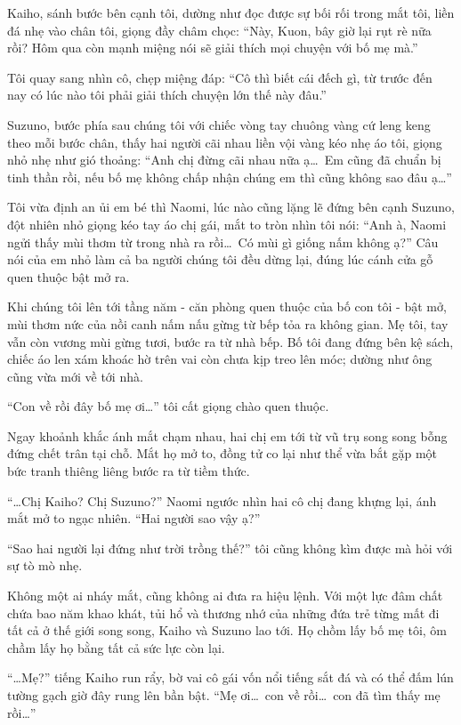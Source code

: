 ﻿\documentclass[../main.tex]{subfiles}
\begin{document}
Kaiho, sánh bước bên cạnh tôi, dường như đọc được sự bối rối trong mắt tôi, liền đá nhẹ vào chân tôi, giọng đầy châm chọc: ``Này, Kuon, bây giờ lại rụt rè nữa rồi? Hôm qua còn mạnh miệng nói sẽ giải thích mọi chuyện với bố mẹ mà.''

Tôi quay sang nhìn cô, chẹp miệng đáp: ``Cô thì biết cái đếch gì, từ trước đến nay có lúc nào tôi phải giải thích chuyện lớn thế này đâu.''

Suzuno, bước phía sau chúng tôi với chiếc vòng tay chuông vàng cứ leng keng theo mỗi bước chân, thấy hai người cãi nhau liền vội vàng kéo nhẹ áo tôi, giọng nhỏ nhẹ như gió thoảng: ``Anh chị đừng cãi nhau nữa ạ\dots\ Em cũng đã chuẩn bị tinh thần rồi, nếu bố mẹ không chấp nhận chúng em thì cũng không sao đâu ạ\dots''

Tôi vừa định an ủi em bé thì Naomi, lúc nào cũng lặng lẽ đứng bên cạnh Suzuno, đột nhiên nhỏ giọng kéo tay áo chị gái, mắt to tròn nhìn tôi nói: ``Anh à, Naomi ngửi thấy mùi thơm từ trong nhà ra rồi\dots\ Có mùi gì giống nấm không ạ?'' Câu nói của em nhỏ làm cả ba người chúng tôi đều dừng lại, đúng lúc cánh cửa gỗ quen thuộc bật mở ra.

Khi chúng tôi lên tới tầng năm - căn phòng quen thuộc của bố con tôi - bật mở, mùi thơm nức của nồi canh nấm nấu gừng từ bếp tỏa ra không gian. Mẹ tôi, tay vẫn còn vương mùi gừng tươi, bước ra từ nhà bếp. Bố tôi đang đứng bên kệ sách, chiếc áo len xám khoác hờ trên vai còn chưa kịp treo lên móc; dường như ông cũng vừa mới về tới nhà.

``Con về rồi đây bố mẹ ơi\dots'' tôi cất giọng chào quen thuộc.

Ngay khoảnh khắc ánh mắt chạm nhau, hai chị em tới từ vũ trụ song song bỗng đứng chết trân tại chỗ. Mắt họ mở to, đồng tử co lại như thể vừa bắt gặp một bức tranh thiêng liêng bước ra từ tiềm thức.

``\dots Chị Kaiho? Chị Suzuno?'' Naomi ngước nhìn hai cô chị đang khựng lại, ánh mắt mở to ngạc nhiên. ``Hai người sao vậy ạ?''

``Sao hai người lại đứng như trời trồng thế?'' tôi cũng không kìm được mà hỏi với sự tò mò nhẹ.

Không một ai nháy mắt, cũng không ai đưa ra hiệu lệnh. Với một lực đâm chất chứa bao năm khao khát, tủi hổ và thương nhớ của những đứa trẻ từng mất đi tất cả ở thế giới song song, Kaiho và Suzuno lao tới. Họ chồm lấy bố mẹ tôi, ôm chầm lấy họ bằng tất cả sức lực còn lại.

``\dots Mẹ?'' tiếng Kaiho run rẩy, bờ vai cô gái vốn nổi tiếng sắt đá và có thể đấm lún tường gạch giờ đây rung lên bần bật. ``Mẹ ơi\dots\ con về rồi\dots\ con đã tìm thấy mẹ rồi\dots''
\end{document}
